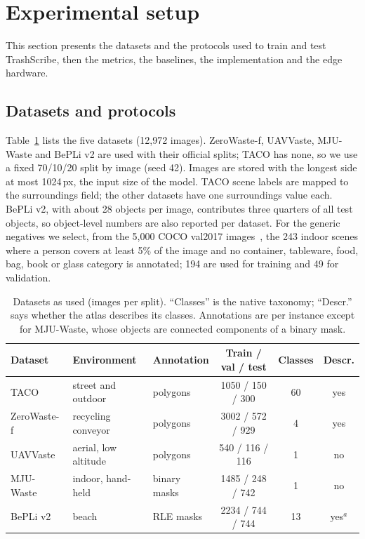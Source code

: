 \documentclass[pdflatex,sn-basic,Numbered]{sn-jnl}%
\newcommand{\trashscribe}{TrashScribe}
\begin{document}
\section{Experimental setup}\label{sec:setup}

This section presents the datasets and the protocols used to train and test \trashscribe{}, then the metrics, the baselines, the implementation and the edge hardware.

\subsection{Datasets and protocols}\label{sec:data}
Table~\ref{tab:datasets} lists the five datasets (12{,}972 images). ZeroWaste-f, UAVVaste, MJU-Waste and BePLi v2 are used with their official splits; TACO has none, so we use a fixed 70/10/20 split by image (seed 42). Images are stored with the longest side at most 1024\,px, the input size of the model. TACO scene labels are mapped to the surroundings field; the other datasets have one surroundings value each. BePLi v2, with about 28 objects per image, contributes three quarters of all test objects, so object-level numbers are also reported per dataset. For the generic negatives we select, from the 5{,}000 COCO val2017 images~\cite{lin2014coco}, the 243 indoor scenes where a person covers at least 5\% of the image and no container, tableware, food, bag, book or glass category is annotated; 194 are used for training and 49 for validation.

\begin{table}[t]
\caption{Datasets as used (images per split). ``Classes'' is the native taxonomy; ``Descr.'' says whether the atlas describes its classes. Annotations are per instance except for MJU-Waste, whose objects are connected components of a binary mask.}\label{tab:datasets}
\centering\footnotesize
\begin{tabular}{@{}lllccc@{}}
\toprule
Dataset & Environment & Annotation & Train / val / test & Classes & Descr.\\
\midrule
TACO~\cite{proenca2020taco} & street and outdoor & polygons & 1050 / 150 / 300 & 60 & yes\\
ZeroWaste-f~\cite{bashkirova2022zerowaste} & recycling conveyor & polygons & 3002 / 572 / 929 & 4 & yes\\
UAVVaste~\cite{kraft2021uavvaste} & aerial, low altitude & polygons & 540 / 116 / 116 & 1 & no\\
MJU-Waste~\cite{wang2020mjuwaste} & indoor, hand-held & binary masks & 1485 / 248 / 742 & 1 & no\\
BePLi v2~\cite{bepli2023} & beach & RLE masks & 2234 / 744 / 744 & 13 & yes$^{a}$\\
\bottomrule
\end{tabular}
\par{}
\end{table}
\end{document}
